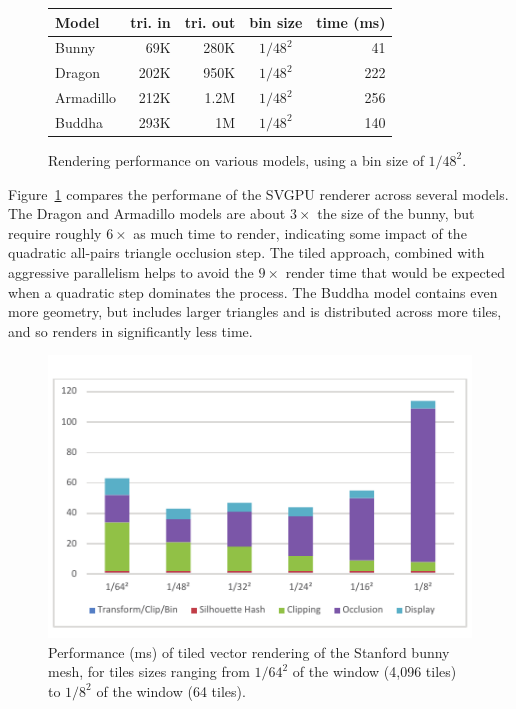 \documentclass[review]{acmsiggraph}
\begin{document}
\begin{figure}
\begin{tabular}{|l|r|r|c|r|} \hline
\bf Model & \bf tri. in & \bf tri. out & \bf bin size & \bf time (ms) \\
\hline
Bunny & 69K & 280K & $1/48^2$ & 41 \\ 
Dragon & 202K & 950K & $1/48^2$ & 222 \\
Armadillo & 212K & 1.2M & $1/48^2$ & 256 \\
Buddha & 293K & 1M & $1/48^2$ & 140 \\ \hline
\end{tabular}
\caption{Rendering performance on various models, using a bin size of
$1/48^2.$}
\label{fig:modelperf}
\end{figure}

Figure~\ref{fig:modelperf} compares the performane of the SVGPU renderer
across several models. The Dragon and Armadillo models are about $3\times$ the
size of the bunny, but require roughly $6\times$ as much time to render,
indicating some impact of the quadratic all-pairs triangle occlusion step. The
tiled approach, combined with aggressive parallelism helps to avoid the
$9\times$ render time that would be expected when a quadratic step dominates
the process. The Buddha model contains even more geometry, but includes larger
triangles and is distributed across more tiles, and so renders in
significantly less time.

\begin{figure} \centering
\includegraphics{images/binperf.pdf}
\caption{Performance (ms) of tiled vector rendering of the Stanford bunny mesh,
for tiles sizes ranging from $1/64^2$ of the window (4,096 tiles) to $1/8^2$ of
the window (64 tiles).}
\label{fig:binperf}
\end{figure}
\end{document}
